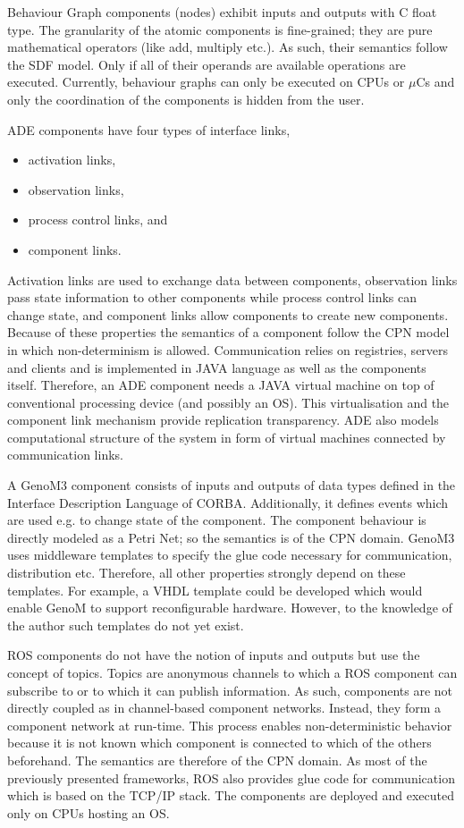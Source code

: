 \documentclass[a4paper,twocolumn]{esapub2005} %
\begin{document}
Behaviour Graph components (nodes) exhibit inputs and outputs with C float type.
The granularity of the atomic components is fine-grained; they are pure mathematical operators (like add, multiply etc.).
As such, their semantics follow the SDF model.
Only if all of their operands are available operations are executed.
Currently, behaviour graphs can only be executed on CPUs or $\mu$Cs and only the coordination of the components is hidden from the user.

ADE components have four types of interface links,
\begin{itemize}
    \item activation links,
    \item observation links,
    \item process control links, and
    \item component links.
\end{itemize}
Activation links are used to exchange data between components,
observation links pass state information to other components while process control links can change state,
and component links allow components to create new components.
Because of these properties the semantics of a component follow the CPN model in which non-determinism is allowed.
Communication relies on registries, servers and clients and is implemented in JAVA language as well as the components itself.
Therefore, an ADE component needs a JAVA virtual machine on top of conventional processing device (and possibly an OS).
This virtualisation and the component link mechanism provide replication transparency.
ADE also models computational structure of the system in form of virtual machines connected by communication links.

A GenoM3 component consists of inputs and outputs of data types defined in the Interface Description Language of CORBA.
Additionally, it defines events which are used e.g. to change state of the component.
The component behaviour is directly modeled as a Petri Net; so the semantics is of the CPN domain.
GenoM3 uses middleware templates to specify the glue code necessary for communication, distribution etc.
Therefore, all other properties strongly depend on these templates.
For example, a VHDL template could be developed which would enable GenoM to support reconfigurable hardware.
However, to the knowledge of the author such templates do not yet exist.

ROS components do not have the notion of inputs and outputs but use the concept of topics.
Topics are anonymous channels to which a ROS component can subscribe to or to which it can publish information.
As such, components are not directly coupled as in channel-based component networks.
Instead, they form a component network at run-time.
This process enables non-deterministic behavior because it is not known which component is connected to which of the others beforehand.
The semantics are therefore of the CPN domain.
As most of the previously presented frameworks, ROS also provides glue code for communication which is based on the TCP/IP stack.
The components are deployed and executed only on CPUs hosting an OS.
\end{document}
